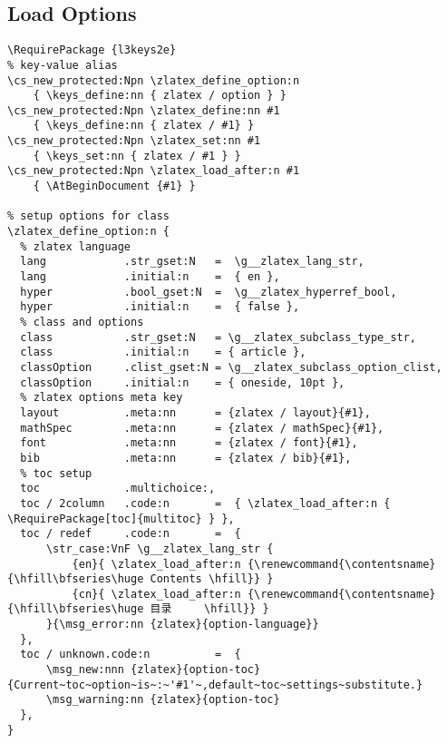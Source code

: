 \subsection{Load Options}
\begin{verbatim}
\RequirePackage {l3keys2e}
% key-value alias
\cs_new_protected:Npn \zlatex_define_option:n
    { \keys_define:nn { zlatex / option } }
\cs_new_protected:Npn \zlatex_define:nn #1
    { \keys_define:nn { zlatex / #1} }
\cs_new_protected:Npn \zlatex_set:nn #1
    { \keys_set:nn { zlatex / #1 } }
\cs_new_protected:Npn \zlatex_load_after:n #1
    { \AtBeginDocument {#1} }

% setup options for class
\zlatex_define_option:n {
  % zlatex language
  lang            .str_gset:N   =  \g__zlatex_lang_str,
  lang            .initial:n    =  { en },
  hyper           .bool_gset:N  =  \g__zlatex_hyperref_bool,
  hyper           .initial:n    =  { false },
  % class and options
  class           .str_gset:N   = \g__zlatex_subclass_type_str,
  class           .initial:n    = { article },
  classOption     .clist_gset:N = \g__zlatex_subclass_option_clist,
  classOption     .initial:n    = { oneside, 10pt },
  % zlatex options meta key 
  layout          .meta:nn      = {zlatex / layout}{#1},
  mathSpec        .meta:nn      = {zlatex / mathSpec}{#1},
  font            .meta:nn      = {zlatex / font}{#1},
  bib             .meta:nn      = {zlatex / bib}{#1},
  % toc setup
  toc             .multichoice:,
  toc / 2column   .code:n       =  { \zlatex_load_after:n { \RequirePackage[toc]{multitoc} } },
  toc / redef     .code:n       =  { 
      \str_case:VnF \g__zlatex_lang_str {
          {en}{ \zlatex_load_after:n {\renewcommand{\contentsname}{\hfill\bfseries\huge Contents \hfill}} }
          {cn}{ \zlatex_load_after:n {\renewcommand{\contentsname}{\hfill\bfseries\huge 目录     \hfill}} }
      }{\msg_error:nn {zlatex}{option-language}}
  },
  toc / unknown.code:n          =  {
      \msg_new:nnn {zlatex}{option-toc}{Current~toc~option~is~:~'#1'~,default~toc~settings~substitute.}
      \msg_warning:nn {zlatex}{option-toc}
  },
}


\end{verbatim}

